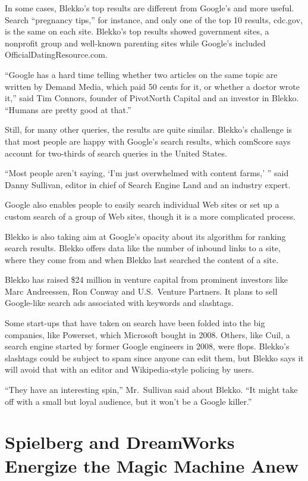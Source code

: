 ﻿\documentclass[12pt]{article}
\begin{document}
In some cases, Blekko's top results are different from Google's and more useful. Search ``pregnancy
tips,'' for instance, and only one of the top 10 results, cdc.gov, is the same on each site.
Blekko's top results showed government sites, a nonprofit group and well-known parenting sites while
Google's included OfficialDatingResource.com.

``Google has a hard time telling whether two articles on the same topic are written by Demand Media,
which paid 50 cents for it, or whether a doctor wrote it,'' said Tim Connors, founder of PivotNorth
Capital and an investor in Blekko. ``Humans are pretty good at that.''

Still, for many other queries, the results are quite similar. Blekko's challenge is that most people
are happy with Google's search results, which comScore says account for two-thirds of search queries
in the United States.

``Most people aren't saying, `I'm just overwhelmed with content farms,' '' said Danny Sullivan,
editor in chief of Search Engine Land and an industry expert.

Google also enables people to easily search individual Web sites or set up a custom search of a
group of Web sites, though it is a more complicated process.

Blekko is also taking aim at Google's opacity about its algorithm for ranking search results. Blekko
offers data like the number of inbound links to a site, where they come from and when Blekko last
searched the content of a site.

Blekko has raised \$24 million in venture capital from prominent investors like Marc Andreessen, Ron
Conway and U.S.~Venture Partners. It plans to sell Google-like search ads associated with keywords
and slashtags.

Some start-ups that have taken on search have been folded into the big companies, like Powerset,
which Microsoft bought in 2008. Others, like Cuil, a search engine started by former Google
engineers in 2008, were flops. Blekko's slashtags could be subject to spam since anyone can edit
them, but Blekko says it will avoid that with an editor and Wikipedia-style policing by users.

``They have an interesting spin,'' Mr.~Sullivan said about Blekko. ``It might take off with a small
but loyal audience, but it won't be a Google killer.''

\section{Spielberg and DreamWorks Energize the Magic Machine Anew}
\end{document}
